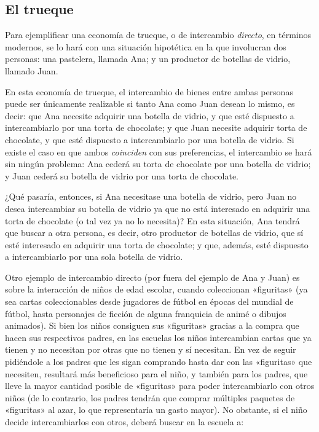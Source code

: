 \documentclass[12pt,a4paper,twoside]{book}
\begin{document}
\subsection{El trueque}
Para ejemplificar una economía de trueque, o de intercambio \textit{directo}, en términos modernos, se lo hará con una situación hipotética en la que involucran dos personas: una pastelera, llamada Ana; y un productor de botellas de vidrio, llamado Juan.

En esta economía de trueque, el intercambio de bienes entre ambas personas puede ser únicamente realizable si tanto Ana como Juan desean lo mismo, es decir: que Ana necesite adquirir una botella de vidrio, y que esté dispuesto a intercambiarlo por una torta de chocolate; y que Juan necesite adquirir torta de chocolate, y que esté dispuesto a intercambiarlo por una botella de vidrio. Si existe el caso en que ambos \textit{coinciden} con sus preferencias, el intercambio se hará sin ningún problema: Ana cederá su torta de chocolate por una botella de vidrio; y Juan cederá su botella de vidrio por una torta de chocolate.

¿Qué pasaría, entonces, si Ana necesitase una botella de vidrio, pero Juan no desea intercambiar su botella de vidrio ya que no está interesado en adquirir una torta de chocolate (o tal vez ya no lo necesita)? En esta situación, Ana tendrá que buscar a otra persona, es decir, otro productor de botellas de vidrio, que sí esté interesado en adquirir una torta de chocolate; y que, además, esté dispuesto a intercambiarlo por una sola botella de vidrio.

Otro ejemplo de intercambio directo (por fuera del ejemplo de Ana y Juan) es sobre la interacción de niños de edad escolar, cuando coleccionan «figuritas» (ya sea cartas coleccionables desde jugadores de fútbol en épocas del mundial de fútbol, hasta personajes de ficción de alguna franquicia de animé o dibujos animados). Si bien los niños consiguen sus «figuritas» gracias a la compra que hacen sus respectivos padres, en las escuelas los niños intercambian cartas que ya tienen y no necesitan por otras que no tienen y sí necesitan. En vez de seguir pidiéndole a los padres que les sigan comprando hasta dar con las «figuritas» que necesiten, resultará más beneficioso para el niño, y también para los padres, que lleve la mayor cantidad posible de «figuritas» para poder intercambiarlo con otros niños (de lo contrario, los padres tendrán que comprar múltiples paquetes de «figuritas» al azar, lo que representaría un gasto mayor). No obstante, si el niño decide intercambiarlos con otros, deberá buscar en la escuela a:
\end{document}
